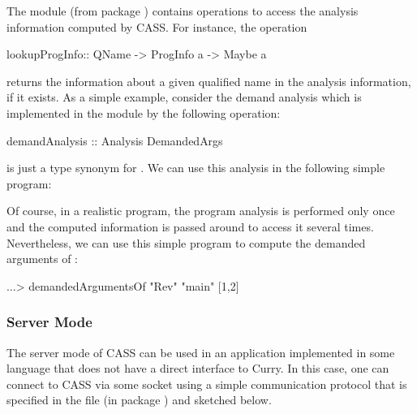 The module  (from package )
contains operations to access the analysis information computed by CASS.
For instance, the operation
\begin{curry}
lookupProgInfo:: QName -> ProgInfo a -> Maybe a
\end{curry}
returns the information about a given qualified name in the
analysis information, if it exists.
As a simple example, consider the demand analysis which is implemented
in the module  by the following operation:
\begin{curry}
demandAnalysis :: Analysis DemandedArgs
\end{curry}
 is just a type synonym for \code{[Int]}.
We can use this analysis in the following simple program:
Of course, in a realistic program, the program analysis
is performed only once and the computed information 
is passed around to access it several times.
Nevertheless, we can use this simple program to compute the
demanded arguments of :
\begin{curry}
$\ldots$> demandedArgumentsOf "Rev" "main"
[1,2]
\end{curry}


\subsubsection{Server Mode}

The server mode of CASS can be used in an application implemented in
some language that does not have a direct interface to Curry.
In this case, one can connect to CASS via
some socket using a simple communication protocol that is specified
in the file  (in package )
and sketched below.

